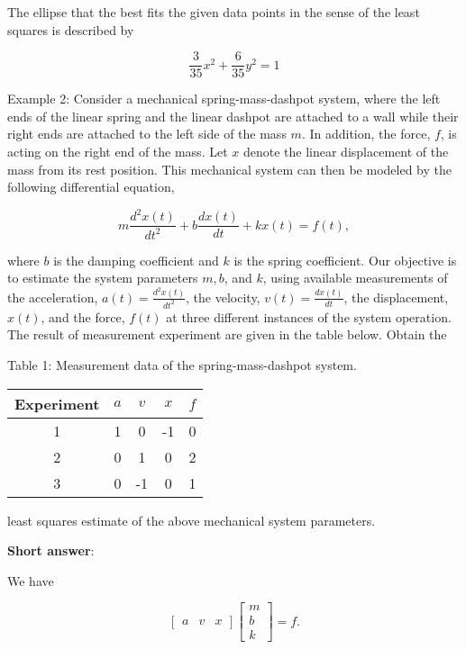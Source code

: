 The ellipse that the best fits the given data points in the sense of the least squares is described by

\[
	\frac{3}{35} x^{2}+\frac{6}{35} y^{2}=1
\]

Example 2: Consider a mechanical spring-mass-dashpot system, where the left ends of the linear spring and the linear dashpot are attached to a wall while their right ends are attached to the left side of the mass \(m\). In addition, the force, \(f\), is acting on the right end of the mass. Let \(x\) denote the linear displacement of the mass from its rest position. This mechanical system can then be modeled by the following differential equation,

\[
	m \frac{d^{2} x(t)}{d t^{2}}+b \frac{d x(t)}{d t}+k x(t)=f(t),
\]

where \(b\) is the damping coefficient and \(k\) is the spring coefficient. Our objective is to estimate the system parameters \(m, b\), and \(k\), using available measurements of the acceleration, \(a(t)=\frac{d^{2} x(t)}{d t^{2}}\), the velocity, \(v(t)=\frac{d x(t)}{d t}\), the displacement, \(x(t)\), and the force, \(f(t)\) at three different instances of the system operation. The result of measurement experiment are given in the table below. Obtain the

Table 1: Measurement data of the spring-mass-dashpot system.

\begin{center}
	\begin{tabular}{c|cccc}
		Experiment & \(a\) & \(v\) & \(x\) & \(f\) \\
		\hline
		1 & 1 & 0 & -1 & 0 \\
		2 & 0 & 1 & 0 & 2 \\
		3 & 0 & -1 & 0 & 1 \\
	\end{tabular}
\end{center}

least squares estimate of the above mechanical system parameters.

\textbf{Short answer}:

We have

\[
	\left[\begin{array}{lll}
		a & v & x
	\end{array}\right]\left[\begin{array}{c}
		m \\
		b \\
		k
	\end{array}\right]=f .
\]

